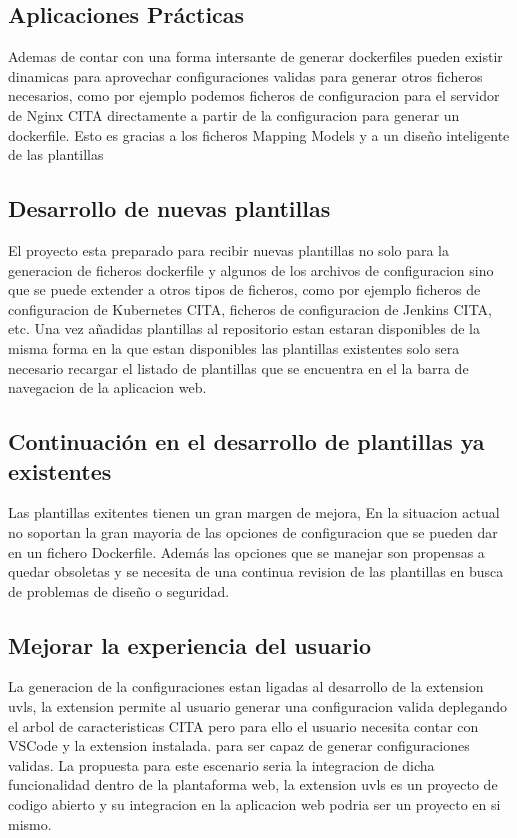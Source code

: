 \documentclass[12pt, a4paper, twoside]{article}
\begin{document}
\subsection{Aplicaciones Prácticas}
Ademas de contar con una forma intersante de generar dockerfiles pueden existir dinamicas para aprovechar configuraciones validas para generar otros ficheros necesarios, como por ejemplo podemos ficheros de configuracion para el servidor de Nginx CITA directamente a partir de la configuracion para generar un dockerfile. Esto es gracias a los ficheros Mapping Models y a un diseño inteligente de las plantillas
\subsection{Desarrollo de nuevas plantillas }
El proyecto esta preparado para recibir nuevas plantillas no solo para la generacion de ficheros dockerfile y algunos de los archivos de configuracion sino que se puede extender a otros tipos de ficheros, como por ejemplo ficheros de configuracion de Kubernetes CITA, ficheros de configuracion de Jenkins CITA, etc.
Una vez añadidas plantillas al repositorio estan estaran disponibles de la misma forma en la que estan disponibles las plantillas existentes solo sera necesario recargar el listado de plantillas que se encuentra en el la barra de navegacion de la aplicacion web.
\subsection{Continuación en el desarrollo de plantillas ya existentes}
Las plantillas exitentes tienen un gran margen de mejora, En la situacion actual no soportan la gran mayoria de las opciones de configuracion que se pueden dar en un fichero Dockerfile. Además las opciones que se manejar son propensas a quedar obsoletas y se necesita de una continua revision de las plantillas en busca de problemas de diseño o seguridad.

\subsection{Mejorar la experiencia del usuario }
La generacion de la configuraciones estan ligadas al desarrollo de la extension uvls, la extension permite al usuario generar una configuracion valida deplegando el arbol de caracteristicas CITA pero para ello el usuario
necesita contar con VSCode y la extension instalada. para ser capaz de generar configuraciones validas. La propuesta para este escenario seria la integracion de dicha funcionalidad dentro de la plantaforma web,
la extension uvls es un proyecto de codigo abierto y su integracion en la aplicacion web podria ser un proyecto en si mismo. 
\end{document}
